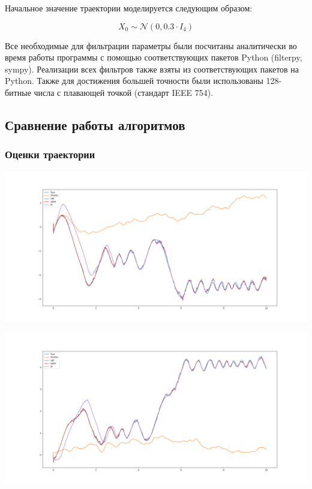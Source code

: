 \documentclass[12pt]{article}
\begin{document}
Начальное значение траектории моделируется следующим образом:

\[
	X_0 \sim \mathcal{N}(0, 0.3 \cdot I_4)
\]

Все необходимые для фильтрации параметры были посчитаны аналитически во время работы программы с помощью соответствующих пакетов Python (filterpy, sympy). Реализации всех фильтров также взяты из соответствующих пакетов на Python. Также для достижения большей точности были использованы 128-битные числа с плавающей точкой (стандарт IEEE 754).

\subsection{Сравнение работы алгоритмов}


\begin{landscape}
	\subsubsection{Оценки траектории}
	\includegraphics[width=1.0\linewidth]{example/estimate_0.png}\newpage
\end{landscape}

\begin{landscape}
	\includegraphics[width=1.0\linewidth]{example/estimate_1.png}\newpage
\end{landscape}
\end{document}
